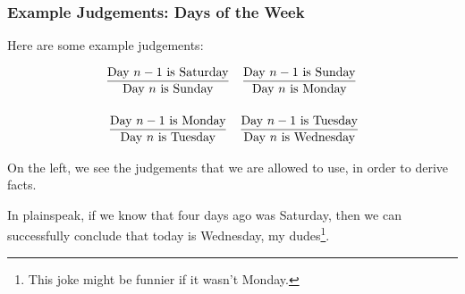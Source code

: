 \documentclass[aspectratio=169, handout]{beamer}
\begin{document}
\begin{frame}[fragile]
  \frametitle{Example Judgements: Days of the Week}


  Here are some example judgements:

  \vspace{1em}

  \begin{minipage}[c]{0.56\textwidth}
  \[
  \begin{array}{cc}
    \infer{\text{Day $n$ is Sunday}}{\text{Day $n-1$ is Saturday}} &
    \infer{\text{Day $n$ is Monday}}{\text{Day $n-1$ is Sunday}} \\[1.5em]
    \infer{\text{Day $n$ is Tuesday}}{\text{Day $n-1$ is Monday}} &
    \infer{\text{Day $n$ is Wednesday}}{\text{Day $n-1$ is Tuesday}}
  \end{array}
  \]
  \end{minipage}\hfill
  \begin{minipage}[c]{0.4\textwidth}
    \centering
  \end{minipage}

  \pause
  \vspace{\fill}

  On the left, we see the judgements that we are allowed to use, in order
  to derive facts.

  \pause
  \vspace{\fill}

  In plainspeak, if we know that four days ago was Saturday, then we can
  successfully conclude that today is Wednesday, my dudes\footnote{This
  joke might be funnier if it wasn't Monday.}.
\end{frame}
\end{document}
